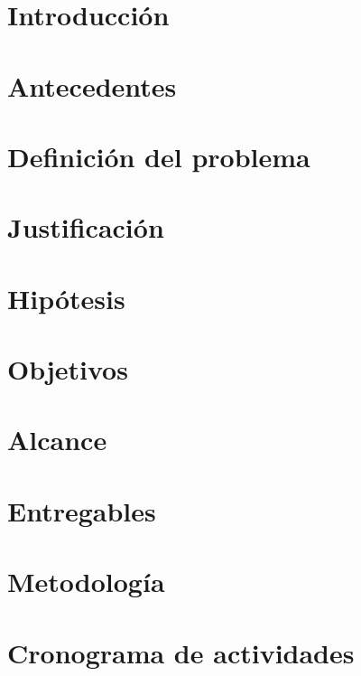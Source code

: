 \documentclass[12pt, twoside]{report}
\begin{document}
\chapter{Introducción}


\chapter{Antecedentes}
\label{cap:antecedentes}


\chapter{Definición del problema}
\label{cap:problema}


\chapter{Justificación}
\label{cap:justificacion}


\chapter{Hipótesis}
\label{cap:hipotesis}


\chapter{Objetivos}
\label{cap:objetivos}


\chapter{Alcance}
\label{cap:alcance}


\chapter{Entregables}
\label{cap:entregables}


\chapter{Metodología}
\label{cap:metodologia}


\chapter{Cronograma de actividades}
\label{cap:cronograma}




\end{document}
